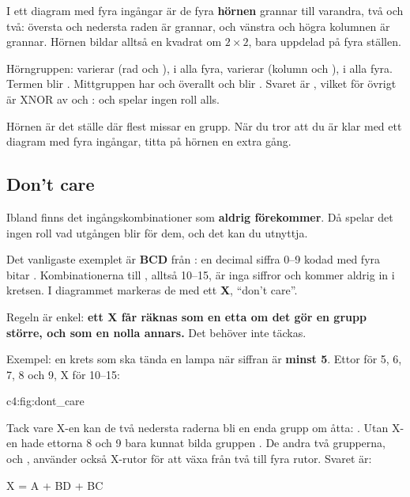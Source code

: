 I ett diagram med fyra ingångar är de fyra \textbf{hörnen} grannar till varandra, två och två:
översta och nedersta raden är grannar, och vänstra och högra kolumnen är grannar. Hörnen bildar
alltså en kvadrat om $2 \times 2$, bara uppdelad på fyra ställen.


\noindent Hörngruppen:  varierar (rad  och ),  i alla fyra,
 varierar (kolumn  och ),  i alla fyra. Termen blir
. Mittgruppen har  och  överallt och blir . Svaret är
, vilket för övrigt är XNOR av  och :  och 
spelar ingen roll alls.

Hörnen är det ställe där flest missar en grupp. När du tror att du är klar med ett diagram med fyra
ingångar, titta på hörnen en extra gång.

\subsection{Don't care}
\label{c4:a6}
Ibland finns det ingångskombinationer som \textbf{aldrig förekommer}. Då spelar det ingen roll vad
utgången blir för dem, och det kan du utnyttja.

Det vanligaste exemplet är \textbf{BCD} från : en decimal siffra 0--9 kodad med fyra
bitar . Kombinationerna  till , alltså 10--15, är inga siffror och
kommer aldrig in i kretsen. I diagrammet markeras de med ett \textbf{X}, \enquote{don't care}.

Regeln är enkel: \textbf{ett X får räknas som en etta om det gör en grupp större, och som en nolla
annars.} Det behöver inte täckas.

Exempel: en krets som ska tända en lampa när siffran är \textbf{minst 5}. Ettor för 5, 6, 7, 8 och
9, X för 10--15:

%
{c4:fig:dont_care}

\noindent Tack vare X-en kan de två nedersta raderna bli en enda grupp om åtta: . Utan X-en
hade ettorna 8 och 9 bara kunnat bilda gruppen . De andra två grupperna,  och
, använder också X-rutor för att växa från två till fyra rutor. Svaret är:

\begin{console}
X = A + BD + BC
\end{console}

